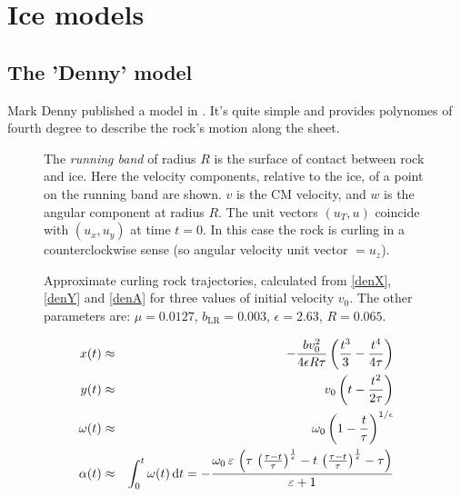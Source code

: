 \chapter{Ice models}
\section{The 'Denny' model\label{denny}}

Mark Denny published a model in \cite{denny:98}. It's quite simple and provides
polynomes of fourth degree to describe the rock's motion along the sheet.

\begin{figure}[htb]
\begin{center}

\end{center}
\caption[Denny setup]{The \emph{running band} of radius $R$ is the surface
    of contact between rock and ice. Here the velocity components, relative to
    the ice, of a point on the running band are shown. $v$ is the CM velocity,
    and $w$ is the angular component at radius $R$. The unit vectors $(u_T, u)$
    coincide with $(u_x,u_y)$ at time $t=0$. In this case the rock is curling
    in a counterclockwise sense (so angular velocity unit vector $=u_z$).
    }
\end{figure}

\iftrue
\begin{figure}[tb]
\begin{center}

\end{center}
\caption[Curling rock trajectories]{%
     Approximate curling rock trajectories, calculated from 
     \eqref{denX}, \eqref{denY} and \eqref{denA}
     for three values of initial velocity $v_0$. The other parameters are:
     $\mu           = 0.0127$,
     $b_\mathrm{LR} = 0.003$,
     $\epsilon      = 2.63$,
     $R             = 0.065$.}
\end{figure}
\fi

\begin{eqnarray}
\eqlab{denX}
x(t) &\approx& - \frac{ b v_0^2 }{ 4 \epsilon R \tau }
    \left( \frac{ t^3 }{ 3 } - \frac{ t^4 } { 4 \tau } \right) \\
\eqlab{denY}
y(t) &\approx& v_0 \left( t - \frac{ t^2 }{ 2\tau } \right) \\
\eqlab{denW}
\omega(t) &\approx& \omega_0 \left(1 - \frac{t}{\tau}\right)^{1/\epsilon} \\
\eqlab{denA}
\alpha(t) &\approx& \int_0^t \omega(t) \dt = -{{\omega_{0}\,\varepsilon\,\left(\tau\,\left({{\tau-t}\over{\tau}}
 \right)^{{{1}\over{\varepsilon}}}-t\,\left({{\tau-t}\over{\tau}}
 \right)^{{{1}\over{\varepsilon}}}-\tau\right)}\over{\varepsilon+1}}
\end{eqnarray}

